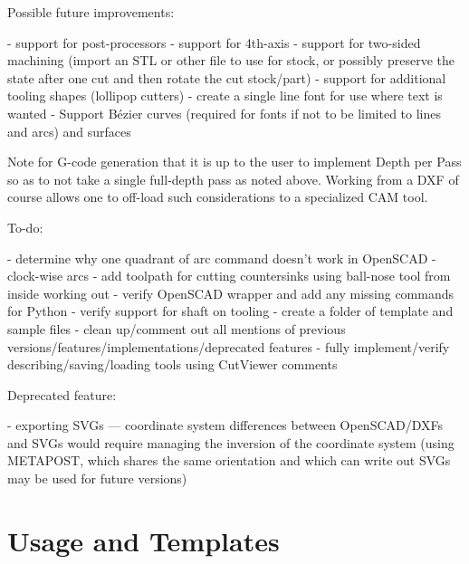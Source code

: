 \documentclass{ltxdoc}
\begin{document}
\begin{readme}
Possible future improvements:

 - support for post-processors
 - support for 4th-axis
 - support for two-sided machining (import an STL or other file to use for stock, or possibly preserve the state after one cut and then rotate the cut stock/part)
 - support for additional tooling shapes (lollipop cutters)
 - create a single line font for use where text is wanted
 - Support Bézier curves (required for fonts if not to be limited to lines and arcs) and surfaces

Note for G-code generation that it is up to the user to implement Depth per Pass so as to not take a single full-depth pass as noted above. Working from a DXF of course allows one to off-load such considerations to a specialized CAM tool.

To-do:

 - determine why one quadrant of arc command doesn't work in OpenSCAD
 - clock-wise arcs
 - add toolpath for cutting countersinks using ball-nose tool from inside working out
 - verify OpenSCAD wrapper and add any missing commands for Python
 - verify support for shaft on tooling
 - create a folder of template and sample files
 - clean up/comment out all mentions of previous versions/features/implementations/deprecated features
 - fully implement/verify describing/saving/loading tools using CutViewer comments

Deprecated feature:

 - exporting SVGs --- coordinate system differences between OpenSCAD/DXFs and SVGs would require managing the inversion of the coordinate system (using METAPOST, which shares the same orientation and which can write out SVGs may be used for future versions)

\end{readme}



\clearpage

\section{Usage and Templates}
\end{document}

